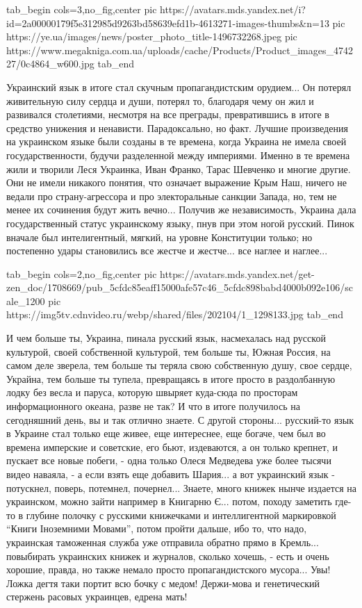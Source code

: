 \ifcmt
  tab_begin cols=3,no_fig,center
     pic https://avatars.mds.yandex.net/i?id=2a00000179f5e312985d9263bd58639efd1b-4613271-images-thumbs&n=13
		 pic https://ye.ua/images/news/poster_photo_title-1496732268.jpeg
		 pic https://www.megakniga.com.ua/uploads/cache/Products/Product_images_474227/0c4864_w600.jpg
  tab_end
\fi

Украинский язык в итоге стал скучным пропагандистским орудием... Он потерял
живительную силу сердца и души, потерял то, благодаря чему он жил и развивался
столетиями, несмотря на все преграды, превратившись в итоге в средство унижения
и ненависти. Парадоксально, но факт. Лучшие произведения на украинском языке
были созданы в те времена, когда Украина не имела своей государственности,
будучи разделенной между империями. Именно в те времена жили и творили Леся
Украинка, Иван Франко, Тарас Шевченко и многие другие. Они не имели никакого
понятия, что означает выражение Крым Наш, ничего не ведали про страну-агрессора
и про электоральные санкции Запада, но, тем не менее их сочинения будут жить
вечно... Получив же независимость, Украина дала государственный статус
украинскому языку, пнув при этом ногой русский. Пинок вначале был
интелигентный, мягкий, на уровне Конституции только; но постепенно удары
становились все жестче и жестче... все наглее и наглее... 

\ifcmt
  tab_begin cols=2,no_fig,center
     pic https://avatars.mds.yandex.net/get-zen_doc/1708669/pub_5cfdc85eaff15000afe57c46_5cfdc898babd4000b092e106/scale_1200
		 pic https://img5tv.cdnvideo.ru/webp/shared/files/202104/1_1298133.jpg
  tab_end
\fi

И чем больше ты, Украина, пинала русский язык, насмехалась над русской
культурой, своей собственной культурой, тем больше ты, Южная Россия, на самом
деле зверела, тем больше ты теряла свою собственную душу, свое сердце, Украйна,
тем больше ты тупела, превращаясь в итоге просто в раздолбанную лодку без весла
и паруса, которую швыряет куда-сюда по просторам информационного океана, разве
не так? И что в итоге получилось на сегодняшний день, вы и так отлично знаете.
С другой стороны... русский-то язык в Украине стал только еще живее, еще
интереснее, еще богаче, чем был во времена имперские и советские, его бьют,
издеваются, а он только крепнет, и пускает все новые побеги, - одна только
Олеся Медведева уже более тысячи видео наваяла, - а если взять еще добавить
Шария... а вот украинский язык - потускнел, поверь, потемнел, почернел...
Знаете, много книжек нынче издается на украинском, можно зайти например в
Книгарню Є... потом, походу заметить где-то в глубине полочку с русскими
книжечками и интеллигентной маркировкой \enquote{Книги Іноземними Мовами},
потом пройти дальше, ибо то, что надо, украинская таможенная служба уже
отправила обратно прямо в Кремль... повыбирать украинских книжек и журналов,
сколько хочешь, - есть и очень хорошие, правда, но также немало просто
пропагандистского мусора...  Увы!  Ложка дегтя таки портит всю бочку с медом!
Держи-мова и генетический стержень расовых украинцев, едрена мать! 

